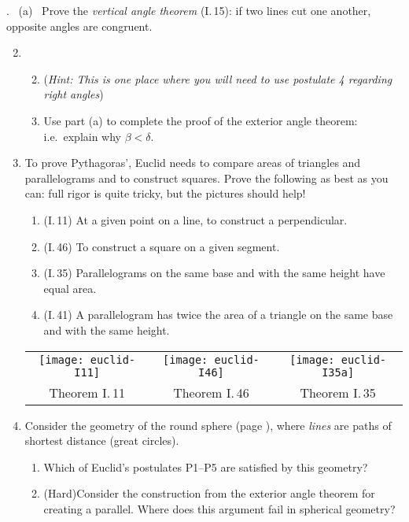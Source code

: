 \begin{exercises}
	\hangindent{}. \ (a) \ Prove the \emph{vertical angle theorem} (I.\,15): if two lines cut one another, opposite angles are congruent.\vspace{-8pt}

	\begin{enumerate}\setcounter{enumi}{1}
	  \item[]\begin{enumerate}\setcounter{enumii}{1}
	    \item[](\emph{Hint: This is one place where you will need to use postulate 4 regarding right angles})
	    \item Use part (a) to complete the proof of the exterior angle theorem: i.e.\ explain why $\beta<\delta$.
	  \end{enumerate}
	
		\item\label{ex:pythagexs} To prove Pythagoras', Euclid needs to compare areas of triangles and parallelograms and to construct squares. Prove the following as best as you can: full rigor is quite tricky, but the pictures should help!
		\begin{enumerate}
		  \item (I.\,11) At a given point on a line, to construct a perpendicular.
		  \item (I.\,46) To construct a square on a given segment.
		  \item (I.\,35) Parallelograms on the same base and with the same height have equal area.
		  \item (I.\,41) A parallelogram has twice the area of a triangle on the same base and with the same height.
		\end{enumerate}
		
		\begin{center}
			\begin{tabular}{ccc}
				\texttt{[image: euclid-I11]}
				&
				\texttt{[image: euclid-I46]}
				&
				\texttt{[image: euclid-I35a]}
				\\[-2pt]
				Theorem I.\,11
				&
				Theorem I.\,46
				&
				Theorem I.\,35
			\end{tabular}
		\end{center}
		
	  
	  \item Consider the geometry of the round sphere (page \pageref{pg:sphere}), where \emph{lines} are paths of shortest distance (great circles).
	 	\begin{enumerate}
	 	  \item Which of Euclid's postulates P1--P5 are satisfied by this geometry?
	  	\item (Hard)\lstsp Consider the construction from the exterior angle theorem for creating a parallel. Where does this argument fail in spherical geometry? 
	 	\end{enumerate}
	  

\end{enumerate}
\end{exercises}
